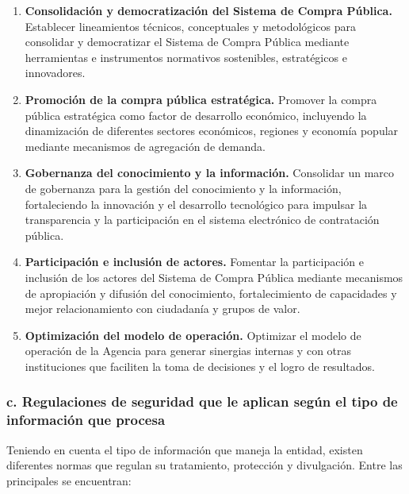 \begin{enumerate}
    \item \textbf{Consolidación y democratización del Sistema de Compra Pública.} Establecer lineamientos técnicos, conceptuales y metodológicos para consolidar y democratizar el Sistema de Compra Pública mediante herramientas e instrumentos normativos sostenibles, estratégicos e innovadores.
    \item \textbf{Promoción de la compra pública estratégica.} Promover la compra pública estratégica como factor de desarrollo económico, incluyendo la dinamización de diferentes sectores económicos, regiones y economía popular mediante mecanismos de agregación de demanda.
    \item \textbf{Gobernanza del conocimiento y la información.} Consolidar un marco de gobernanza para la gestión del conocimiento y la información, fortaleciendo la innovación y el desarrollo tecnológico para impulsar la transparencia y la participación en el sistema electrónico de contratación pública.
    \item \textbf{Participación e inclusión de actores.} Fomentar la participación e inclusión de los actores del Sistema de Compra Pública mediante mecanismos de apropiación y difusión del conocimiento, fortalecimiento de capacidades y mejor relacionamiento con ciudadanía y grupos de valor.
    \item \textbf{Optimización del modelo de operación.} Optimizar el modelo de operación de la Agencia para generar sinergias internas y con otras instituciones que faciliten la toma de decisiones y el logro de resultados.
\end{enumerate}

\subsubsection{c. Regulaciones de seguridad que le aplican según el tipo de información que procesa}
Teniendo en cuenta el tipo de información que maneja la entidad, existen diferentes normas que regulan su tratamiento, protección y divulgación. Entre las principales se encuentran:

